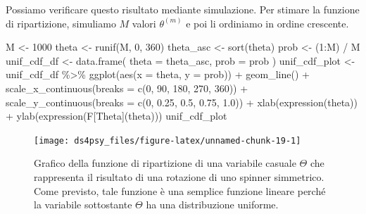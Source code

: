 \documentclass[
  11pt,
]{krantz}
\makeatletter
\newenvironment{Shaded}{\begin{snugshade}}{\end{snugshade}}
\newcommand{\AttributeTok}[1]{\textcolor[rgb]{0.61,0.61,0.61}{#1}}
\newcommand{\DecValTok}[1]{\textcolor[rgb]{0.06,0.06,0.06}{#1}}
\newcommand{\FloatTok}[1]{\textcolor[rgb]{0.06,0.06,0.06}{#1}}
\newcommand{\FunctionTok}[1]{\textcolor[rgb]{0,0,0}{#1}}
\newcommand{\NormalTok}[1]{#1}
\newcommand{\OtherTok}[1]{\textcolor[rgb]{0.37,0.37,0.37}{#1}}
\newcommand{\SpecialCharTok}[1]{\textcolor[rgb]{0,0,0}{#1}}
\newenvironment{kframe}{%
\medskip{}
\setlength{\fboxsep}{.8em}
 \def\at@end@of@kframe{}%
 \ifinner\ifhmode%
  \def\at@end@of@kframe{\end{minipage}}%
  \begin{minipage}{\columnwidth}%
 \fi\fi%
 \def\FrameCommand##1{\hskip\@totalleftmargin \hskip-\fboxsep
 \colorbox{shadecolor}{##1}\hskip-\fboxsep
     \hskip-\linewidth \hskip-\@totalleftmargin \hskip\columnwidth}%
 \MakeFramed {\advance\hsize-\width
   \@totalleftmargin\z@ \linewidth\hsize
   \@setminipage}}%
 {\par\unskip\endMakeFramed%
 \at@end@of@kframe}
\renewenvironment{Shaded}{\begin{kframe}}{\end{kframe}}
\theoremstyle{definition}
\theoremstyle{definition}
\theoremstyle{definition}
\theoremstyle{definition}
\theoremstyle{remark}
\makeatother
\begin{document}
Possiamo verificare questo risultato mediante simulazione. Per stimare la funzione di ripartizione, simuliamo \(M\) valori \(\theta^{(m)}\) e poi li ordiniamo in ordine crescente.

\begin{Shaded}
\begin{Highlighting}[]
\NormalTok{M }\OtherTok{\textless{}{-}} \DecValTok{1000}
\NormalTok{theta }\OtherTok{\textless{}{-}} \FunctionTok{runif}\NormalTok{(M, }\DecValTok{0}\NormalTok{, }\DecValTok{360}\NormalTok{)}
\NormalTok{theta\_asc }\OtherTok{\textless{}{-}} \FunctionTok{sort}\NormalTok{(theta)}
\NormalTok{prob }\OtherTok{\textless{}{-}}\NormalTok{ (}\DecValTok{1}\SpecialCharTok{:}\NormalTok{M) }\SpecialCharTok{/}\NormalTok{ M}
\NormalTok{unif\_cdf\_df }\OtherTok{\textless{}{-}} \FunctionTok{data.frame}\NormalTok{(}
  \AttributeTok{theta =}\NormalTok{ theta\_asc,}
  \AttributeTok{prob =}\NormalTok{ prob}
\NormalTok{)}
\NormalTok{unif\_cdf\_plot }\OtherTok{\textless{}{-}}
\NormalTok{  unif\_cdf\_df }\SpecialCharTok{\%\textgreater{}\%}
  \FunctionTok{ggplot}\NormalTok{(}\FunctionTok{aes}\NormalTok{(}\AttributeTok{x =}\NormalTok{ theta, }\AttributeTok{y =}\NormalTok{ prob)) }\SpecialCharTok{+}
  \FunctionTok{geom\_line}\NormalTok{() }\SpecialCharTok{+}
  \FunctionTok{scale\_x\_continuous}\NormalTok{(}\AttributeTok{breaks =} \FunctionTok{c}\NormalTok{(}\DecValTok{0}\NormalTok{, }\DecValTok{90}\NormalTok{, }\DecValTok{180}\NormalTok{, }\DecValTok{270}\NormalTok{, }\DecValTok{360}\NormalTok{)) }\SpecialCharTok{+}
  \FunctionTok{scale\_y\_continuous}\NormalTok{(}\AttributeTok{breaks =} \FunctionTok{c}\NormalTok{(}\DecValTok{0}\NormalTok{, }\FloatTok{0.25}\NormalTok{, }\FloatTok{0.5}\NormalTok{, }\FloatTok{0.75}\NormalTok{, }\FloatTok{1.0}\NormalTok{)) }\SpecialCharTok{+}
  \FunctionTok{xlab}\NormalTok{(}\FunctionTok{expression}\NormalTok{(theta)) }\SpecialCharTok{+}
  \FunctionTok{ylab}\NormalTok{(}\FunctionTok{expression}\NormalTok{(F[Theta](theta)))}
\NormalTok{unif\_cdf\_plot}
\end{Highlighting}
\end{Shaded}

\begin{figure}[h]

{\centering \texttt{[image: ds4psy\_files/figure-latex/unnamed-chunk-19-1]} 

}

\caption{Grafico della funzione di ripartizione di una variabile casuale $\Theta$ che rappresenta il risultato di una rotazione di uno spinner simmetrico. Come previsto, tale funzione è una semplice funzione lineare perché la variabile sottostante $\Theta$ ha una distribuzione uniforme.}\label{fig:unnamed-chunk-19}
\end{figure}
\end{document}
